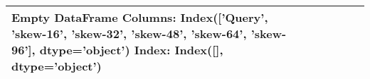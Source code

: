 \begin{tabular}{lllllll}
\toprule
Empty DataFrame
Columns: Index(['Query', 'skew-16', 'skew-32', 'skew-48', 'skew-64', 'skew-96'], dtype='object')
Index: Index([], dtype='object') \\
\bottomrule
\end{tabular}
